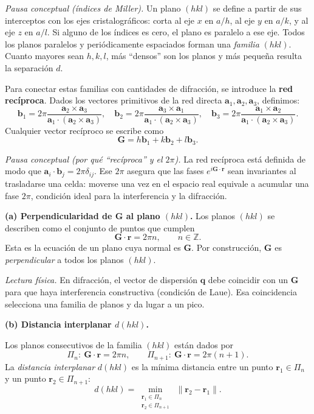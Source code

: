 \documentclass{article}
\begin{document}
\medskip
\noindent\textit{Pausa conceptual (índices de Miller).}  
Un plano \((hkl)\) se define a partir de sus interceptos con los ejes cristalográficos: corta al eje \(x\) en \(a/h\), al eje \(y\) en \(a/k\), y al eje \(z\) en \(a/l\). Si alguno de los índices es cero, el plano es paralelo a ese eje.  
Todos los planos paralelos y periódicamente espaciados forman una \emph{familia} \((hkl)\). Cuanto mayores sean \(h,k,l\), más “densos” son los planos y más pequeña resulta la separación \(d\).

\medskip
Para conectar estas familias con cantidades de difracción, se introduce la \textbf{red recíproca}. Dados los vectores primitivos de la red directa \(\mathbf{a}_1,\mathbf{a}_2,\mathbf{a}_3\), definimos:
\[
\mathbf{b}_1 = 2\pi \frac{\mathbf{a}_2 \times \mathbf{a}_3}{\mathbf{a}_1 \cdot (\mathbf{a}_2 \times \mathbf{a}_3)}, \quad
\mathbf{b}_2 = 2\pi \frac{\mathbf{a}_3 \times \mathbf{a}_1}{\mathbf{a}_1 \cdot (\mathbf{a}_2 \times \mathbf{a}_3)}, \quad
\mathbf{b}_3 = 2\pi \frac{\mathbf{a}_1 \times \mathbf{a}_2}{\mathbf{a}_1 \cdot (\mathbf{a}_2 \times \mathbf{a}_3)}.
\]
Cualquier vector recíproco se escribe como
\[
\mathbf{G} = h\mathbf{b}_1 + k\mathbf{b}_2 + l\mathbf{b}_3.
\]

\medskip
\noindent\textit{Pausa conceptual (por qué “recíproca” y el \(2\pi\)).}  
La red recíproca está definida de modo que \(\mathbf{a}_i \cdot \mathbf{b}_j = 2\pi \delta_{ij}\). Ese \(2\pi\) asegura que las fases \(e^{i\mathbf{G}\cdot\mathbf{r}}\) sean invariantes al trasladarse una celda: moverse una vez en el espacio real equivale a acumular una fase \(2\pi\), condición ideal para la interferencia y la difracción.

\bigskip
\textbf{(a) Perpendicularidad de \(\mathbf{G}\) al plano \((hkl)\).}  
Los planos \((hkl)\) se describen como el conjunto de puntos que cumplen
\[
\mathbf{G}\cdot \mathbf{r} = 2\pi n, \qquad n\in\mathbb{Z}.
\]
Esta es la ecuación de un plano cuya normal es \(\mathbf{G}\). Por construcción, \(\mathbf{G}\) es \emph{perpendicular} a todos los planos \((hkl)\).

\medskip
\noindent\textit{Lectura física.}  
En difracción, el vector de dispersión \(\mathbf{q}\) debe coincidir con un \(\mathbf{G}\) para que haya interferencia constructiva (condición de Laue). Esa coincidencia selecciona una familia de planos y da lugar a un pico.

\bigskip
\textbf{(b) Distancia interplanar \(d(hkl)\).}

Los planos consecutivos de la familia \((hkl)\) están dados por
\[
\Pi_n:\ \mathbf{G}\!\cdot\!\mathbf{r}=2\pi n,
\qquad
\Pi_{n+1}:\ \mathbf{G}\!\cdot\!\mathbf{r}=2\pi (n+1).
\]
La \emph{distancia interplanar} \(d(hkl)\) es la mínima distancia entre un punto \(\mathbf{r}_1\in\Pi_n\) y un punto \(\mathbf{r}_2\in\Pi_{n+1}\):
\[
d(hkl)=\min_{\substack{\mathbf{r}_1\in\Pi_n\\ \mathbf{r}_2\in\Pi_{n+1}}}\ \|\mathbf{r}_2-\mathbf{r}_1\|.
\]
\end{document}
